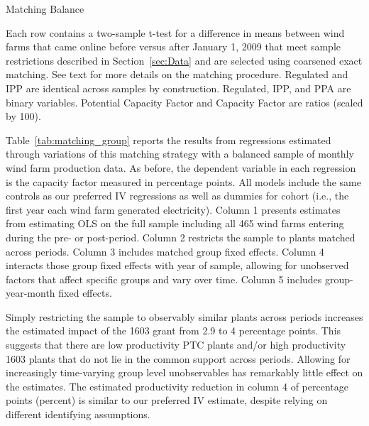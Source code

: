 \documentclass[12pt]{article}
\begin{document}
\begin{table}[h]
\caption{Matching Balance \label{tab:matching_balance}}

\footnotesize

Each row contains a two-sample t-test for a difference in means between wind farms that came online before versus after January 1, 2009 that meet sample restrictions described in Section~\ref{sec:Data} and are selected using coarsened exact matching. See text for more details on the matching procedure. Regulated and IPP are identical across samples by construction. Regulated, IPP, and PPA are binary variables. Potential Capacity Factor and Capacity Factor are ratios (scaled by 100).
\end{table}

Table~\ref{tab:matching_group} reports the results from regressions estimated through variations of this matching strategy with a balanced sample of monthly wind farm production data. As before, the dependent variable in each regression is the capacity factor measured in percentage points. All models include the same controls as our preferred IV regressions as well as dummies for cohort (i.e., the first year each wind farm generated electricity). Column 1 presents estimates from estimating OLS on the full sample including all 465 wind farms entering during the pre- or post-period. Column 2 restricts the sample to plants matched across periods. Column 3 includes matched group fixed effects. Column 4 interacts those group fixed effects with year of sample, allowing for unobserved factors that affect specific groups and vary over time. Column 5 includes group-year-month fixed effects. 

Simply restricting the sample to observably similar plants across periods increases the estimated impact of the 1603 grant from 2.9 to 4 percentage points. This suggests that there are low productivity PTC plants and/or high productivity 1603 plants that do not lie in the common support across periods. Allowing for increasingly time-varying group level unobservables has remarkably little effect on the estimates. The estimated productivity reduction in column 4 of percentage points (percent) is similar to our preferred IV estimate, despite relying on different identifying assumptions.
\end{document}

